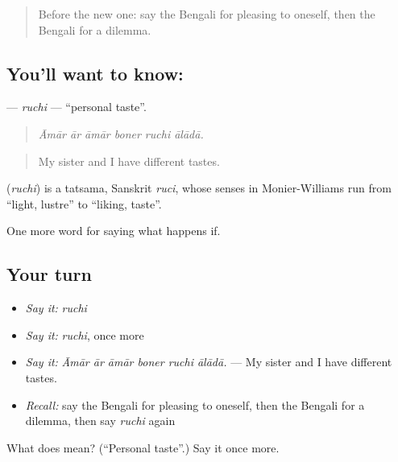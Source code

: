 \begin{quote}
Before the new one: say the Bengali for pleasing to oneself, then the Bengali for a dilemma.
\end{quote}

\subsection*{You'll want to know: }
\textbf{} — \emph{ruchi} — \textquotedblleft{}personal taste\textquotedblright{}.

\begin{quote}
     
\end{quote}

\begin{quote}
\emph{Āmār ār āmār boner ruchi ālādā.}
\end{quote}

\begin{quote}
My sister and I have different tastes.
\end{quote}

\begin{cousinweb}
\textbf{} (\emph{ruchi}) is a tatsama, Sanskrit \emph{ruci}, whose senses in Monier-Williams run from \textquotedblleft{}light, lustre\textquotedblright{} to \textquotedblleft{}liking, taste\textquotedblright{}.
\end{cousinweb}

\begin{grammarlens}[title={What you've built}]
One more word for saying what happens if.
\end{grammarlens}

\subsection*{Your turn}
\begin{itemize}
\raggedright
  \item \emph{Say it:} \emph{ruchi}
  \item \emph{Say it:} \emph{ruchi}, once more
  \item \emph{Say it:} \emph{Āmār ār āmār boner ruchi ālādā.} — My sister and I have different tastes.
  \item \emph{Recall:} say the Bengali for pleasing to oneself, then the Bengali for a dilemma, then say \emph{ruchi} again
\end{itemize}

\begin{tcolorbox}[breakable,colback=teal!4,colframe=teal!35!black,title={Before you move on}]
What does  mean? (\textquotedblleft{}Personal taste\textquotedblright{}.) Say it once more.
\end{tcolorbox}
